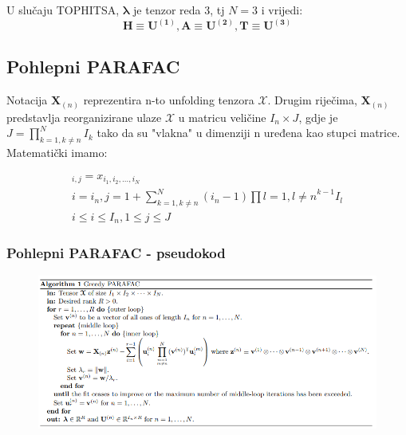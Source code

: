 \documentclass[11pt]{article}
\begin{document}
U slučaju TOPHITSA, $\boldsymbol{\lambda}$ je tenzor reda 3, tj $N = 3$ i vrijedi:
\begin{equation}
    \boldsymbol{H \equiv U^{(1)}}, 
    \boldsymbol{A \equiv U^{(2)}}, 
    \boldsymbol{T \equiv U^{(3)}}
\end{equation}

\subsection{Pohlepni PARAFAC}

Notacija $\boldsymbol{X}_{(n)}$ reprezentira n-to unfolding tenzora $\boldsymbol{\mathcal{X}}$. Drugim riječima, $\boldsymbol{X}_{(n)}$ predstavlja reorganizirane ulaze $\boldsymbol{\mathcal{X}}$ u matricu veličine $I_n \times J$, gdje je $J = \prod_{k=1, k \neq n} ^{N} I_{k}$ tako da su "vlakna" u dimenziji n uređena kao stupci matrice. Matematički imamo:

\begin{multline}
    [\boldsymbol{X}_{(n)}]_{i,j} = x_{i_1, i_2, \ldots, i_N} \\
    i = i_n, j = 1 + \sum_{k=1, k \neq n} ^{N} (i_n - 1) \prod{l=1, l\neq n} ^{k-1} I_l \\
    i \leq i \leq I_n, 1 \leq j \leq J
\end{multline}

\subsubsection{Pohlepni PARAFAC - pseudokod}

\begin{figure}[hbt!]
    \centering
    \includegraphics[width=420pt]{1.alg.png}  
    \label{fig:5}
\end{figure}

\newpage
\end{document}
